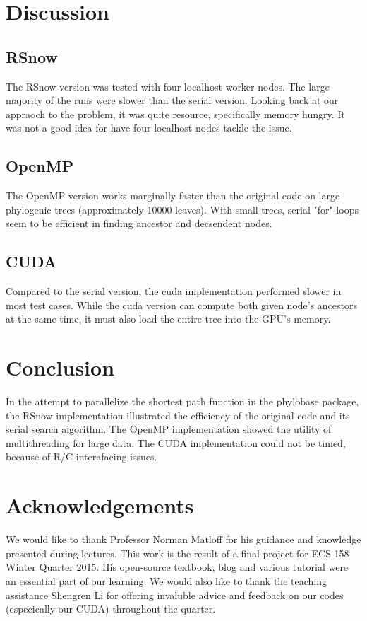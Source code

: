 \documentclass[11pt,letterpaper]{article}
\begin{document}
\section{Discussion}

\subsection{RSnow}
The RSnow version was tested with four localhost worker nodes. The large majority of the runs were slower than the serial version. Looking back at our appraoch to the problem, it was quite resource, specifically memory hungry. It was not a good idea for have four localhost nodes tackle the issue. \\

\subsection{OpenMP}
The OpenMP version works marginally faster than the original code on large phylogenic trees (approximately 10000 leaves). With small trees, serial "for" loops seem to be efficient in finding ancestor and decsendent nodes. \\

\subsection{CUDA}

Compared to the serial version, the cuda implementation performed slower in most test cases. While the cuda version can compute both given node’s ancestors at the same time, it must also load the entire tree into the GPU’s memory.\\


\section{Conclusion}
In the attempt to parallelize the shortest path function in the phylobase package, the RSnow implementation illustrated the efficiency of the original code and its serial search algorithm. The OpenMP implementation showed the utility of multithreading for large data. The CUDA implementation could not be timed, because of R/C interafacing issues. 


\section{Acknowledgements}
We would like to thank Professor Norman Matloff for his guidance and knowledge presented during lectures. This work is the result of a final project for ECS 158 Winter Quarter 2015.  His open-source textbook, blog and various tutorial were an essential part of our learning. We would also like to thank the teaching assistance Shengren Li for offering invaluble advice and feedback on our codes (especically our CUDA) throughout the quarter.
\end{document}
